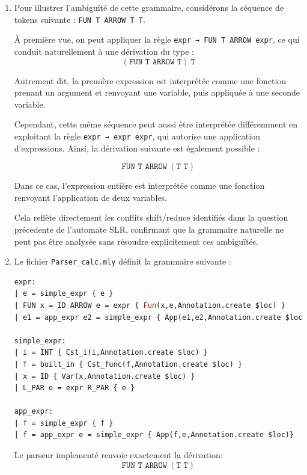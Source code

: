 \begin{enumerate}[label=\arabic*.]
    \item \label{question3}
          Pour illustrer l’ambiguïté de cette grammaire, considérons la séquence de tokens suivante : \texttt{FUN T ARROW T T}.

          À première vue, on peut appliquer la règle \texttt{expr → FUN T ARROW expr}, ce qui conduit naturellement à une dérivation du type :
          \[
              \left( \texttt{FUN T ARROW T} \right) \ \texttt{T}
          \]

          Autrement dit, la première expression est interprétée comme une fonction prenant un argument et renvoyant une variable, puis appliquée à une seconde variable.

          Cependant, cette même séquence peut aussi être interprétée différemment en exploitant la règle \texttt{expr → expr expr}, qui autorise une application d’expressions. Ainsi, la dérivation suivante est également possible :

          \[
              \texttt{FUN T ARROW} \ \left( \texttt{T T} \right)
          \]

          Dans ce cas, l’expression entière est interprétée comme une fonction renvoyant l’application de deux variables.

          Cela reflète directement les conflits shift/reduce identifiés dans la question précedente de l’automate SLR, confirmant que la grammaire naturelle ne peut pas être analysée sans résoudre explicitement ces ambiguïtés.

    \item \label{question4}
          Le fichier \texttt{Parser\_calc.mly} définit la grammaire suivante :

          \begin{lstlisting}[caption={Grammaire du fichier \texttt{Parser\_calc.mly}}, label=lst:parser_calc, language=ocaml]
expr:
| e = simple_expr { e }
| FUN x = ID ARROW e = expr { Fun(x,e,Annotation.create $loc) }
| e1 = app_expr e2 = simple_expr { App(e1,e2,Annotation.create $loc) } 

simple_expr:
| i = INT { Cst_i(i,Annotation.create $loc) }
| f = built_in { Cst_func(f,Annotation.create $loc) }
| x = ID { Var(x,Annotation.create $loc) }
| L_PAR e = expr R_PAR { e }

app_expr:
| f = simple_expr { f }
| f = app_expr e = simple_expr { App(f,e,Annotation.create $loc)} 
          \end{lstlisting}

          Le parseur implementé renvoie exactement la dérivation:
          \[
              \texttt{FUN T ARROW} \ \left( \texttt{T T} \right)
          \]


\end{enumerate}
